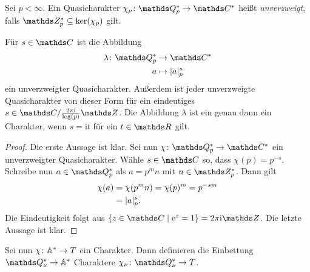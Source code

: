 \begin{defi}
Sei $p<\infty$. Ein Quasicharakter $\chi_p \colon \Q_p^\ast \to \C^\ast$ heißt \emph{unverzweigt}, falls $\Z_p^\ast \subseteq \ker(\chi_p)$ gilt.
\end{defi}

\begin{prop}
Für $s\in \C$ ist die Abbildung
\begin{align*}
\lambda \colon \Q_p^\ast &\to \C^\ast\\
a&\mapsto \abs{a}_p^s
\end{align*}
ein unverzweigter Quasicharakter.
Außerdem ist jeder unverzweigte Quasicharakter von dieser Form für ein eindeutiges $s\in \C/\frac{2\pi \mathrm{i}}{\log(p)}\Z$.
Die Abbildung $\lambda$ ist ein genau dann ein Charakter, wenn $s=\mathrm{i}t$ für ein $t\in \R$ gilt.
\end{prop}
\begin{proof}
Die erste Aussage ist klar.
Sei nun $\chi\colon \Q_p^\ast \to \C^\ast$ ein unverzweigter Quasicharakter.
Wähle $s\in \C$ so, dass $\chi(p)=p^{-s}$.
Schreibe nun $a\in \Q_p^\ast$ als $a=p^m n$ mit $n \in \Z_p^\ast$. Dann gilt
\begin{align*}
\chi(a)&=\chi(p^mn)=\chi(p)^m=p^{-sm}\\
&=|a|_p^s.
\end{align*}
Die Eindeutigkeit folgt aus $\{z \in \C \mid \ex^z=1\}=2\pi \mathrm{i}\Z$.
Die letzte Aussage ist klar.
\end{proof}

Sei nun $\chi \colon \mathbb{A}^\ast \to T$ ein Charakter.
Dann definieren die Einbettung $\Q_\nu^\ast \to \A^\ast$ Charaktere $\chi_\nu \colon \Q_\nu^\ast\to T$.

